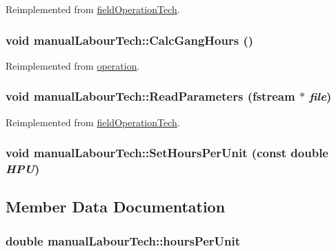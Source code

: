 Reimplemented from \hyperlink{classfield_operation_tech_a908e81a53479de1a6768d58964dbc57c}{fieldOperationTech}.\hypertarget{classmanual_labour_tech_a4947c755580db30ddaf817a7f7238600}{
\subsubsection[{CalcGangHours}]{\setlength{\rightskip}{0pt plus 5cm}void manualLabourTech::CalcGangHours ()}}
\label{classmanual_labour_tech_a4947c755580db30ddaf817a7f7238600}


Reimplemented from \hyperlink{classoperation_a51c5612f29519bc82050ffccf089bc07}{operation}.\hypertarget{classmanual_labour_tech_a1b03a5bb1d552a3bacaeb5bb758a1e17}{
\subsubsection[{ReadParameters}]{\setlength{\rightskip}{0pt plus 5cm}void manualLabourTech::ReadParameters (fstream $\ast$ {\em file})}}
\label{classmanual_labour_tech_a1b03a5bb1d552a3bacaeb5bb758a1e17}


Reimplemented from \hyperlink{classfield_operation_tech_a2a2c416f3f3fe8ceb2f1f1b63c149a09}{fieldOperationTech}.\hypertarget{classmanual_labour_tech_a9470bcb6a62316d2aa73286c436ebb19}{
\subsubsection[{SetHoursPerUnit}]{\setlength{\rightskip}{0pt plus 5cm}void manualLabourTech::SetHoursPerUnit (const double {\em HPU})}}
\label{classmanual_labour_tech_a9470bcb6a62316d2aa73286c436ebb19}


\subsection{Member Data Documentation}
\hypertarget{classmanual_labour_tech_ac0c48d73dd0631c2623916e49a684b60}{
\subsubsection[{hoursPerUnit}]{\setlength{\rightskip}{0pt plus 5cm}double {\bf manualLabourTech::hoursPerUnit}}}
\label{classmanual_labour_tech_ac0c48d73dd0631c2623916e49a684b60}


